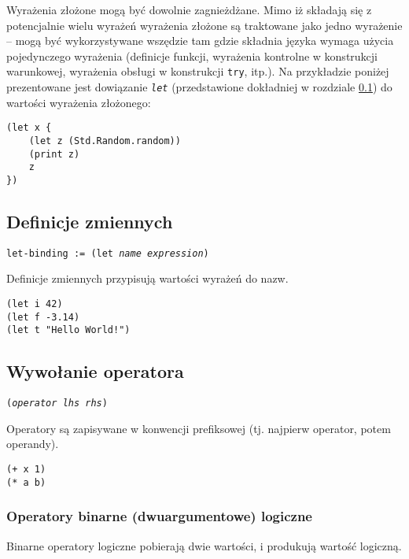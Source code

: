 Wyrażenia złożone mogą być dowolnie zagnieżdżane. Mimo iż składają się z
potencjalnie wielu wyrażeń wyrażenia złożone są traktowane jako jedno wyrażenie
-- mogą być wykorzystywane wszędzie tam gdzie składnia języka wymaga użycia
pojedynczego wyrażenia (definicje funkcji, wyrażenia kontrolne w konstrukcji
warunkowej, wyrażenia obsługi w konstrukcji \texttt{try}, itp.). Na przykładzie
poniżej prezentowane jest dowiązanie \emph{\texttt{let}} (przedstawione
dokładniej w rozdziale \ref{viuact_spec_let_binding}) do wartości wyrażenia
złożonego:

\begin{lstlisting}
(let x {
    (let z (Std.Random.random))
    (print z)
    z
})
\end{lstlisting}

\subsection{Definicje zmiennych}
\label{viuact_spec_let_binding}

\texttt{let-binding := (let \emph{name} \emph{expression})}
\vspace{1em}

Definicje zmiennych przypisują wartości wyrażeń do nazw.

\begin{lstlisting}
(let i 42)
(let f -3.14)
(let t "Hello World!")
\end{lstlisting}

\subsection{Wywołanie operatora}

\texttt{(\emph{operator} \emph{lhs} \emph{rhs})}
\vspace{1em}

Operatory są zapisywane w konwencji prefiksowej (tj. najpierw operator, potem operandy).

\begin{lstlisting}
(+ x 1)
(* a b)
\end{lstlisting}

\subsubsection{Operatory binarne (dwuargumentowe) logiczne}

Binarne operatory logiczne pobierają dwie wartości, i produkują wartość logiczną.

